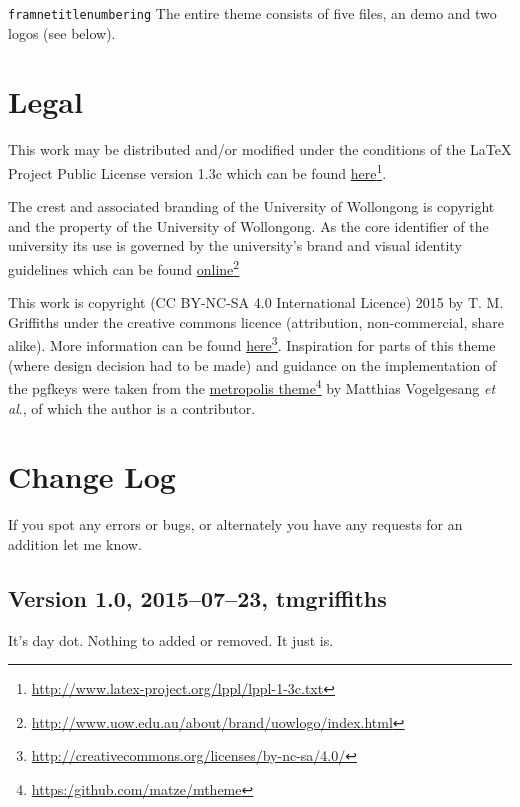 \documentclass[a4paper,oneside,12pt]{article}
\newcommand{\key}[1]{\texttt{\color{UOWorange}#1}}
\begin{document}
\key{framnetitlenumbering} The entire theme consists of five files, an demo and two logos (see below).
\lipsum[1-2]

\section{Legal}
This work may be distributed and/or modified under the conditions of the LaTeX Project Public License version 1.3c which can be found \href{http://www.latex-project.org/lppl/lppl-1-3c.txt}{here}\footnote{\url{http://www.latex-project.org/lppl/lppl-1-3c.txt}}.

The crest and associated branding of the University of Wollongong is copyright and the property of the University of Wollongong. As the core identifier of the university its use is governed by the university's brand and visual identity guidelines which can be found \href{http://www.uow.edu.au/about/brand/uowlogo/index.html}{online}\footnote{\url{http://www.uow.edu.au/about/brand/uowlogo/index.html}}

This work is copyright (CC BY-NC-SA 4.0 International Licence) 2015 by T. M. Griffiths under the creative commons licence (attribution, non-commercial, share alike). More information can be found \href{http://creativecommons.org/licenses/by-nc-sa/4.0/}{here}\footnote{\url{http://creativecommons.org/licenses/by-nc-sa/4.0/}}. Inspiration for parts of this theme (where design decision had to be made) and guidance on the implementation of the pgfkeys were taken from the \href{https:/github.com/matze/mtheme}{metropolis theme}\footnote{\url{https:/github.com/matze/mtheme}} by Matthias Vogelgesang \textit{et al}., of which the author is a contributor. 

\begin{center}\ccbysa\end{center}

\section{Change Log}
If you spot any errors or bugs, or alternately you have any requests for an addition let me know.
\subsection*{Version 1.0, 2015–07–23, tmgriffiths}
It's day dot. Nothing to added or removed. It just is.
\end{document}

